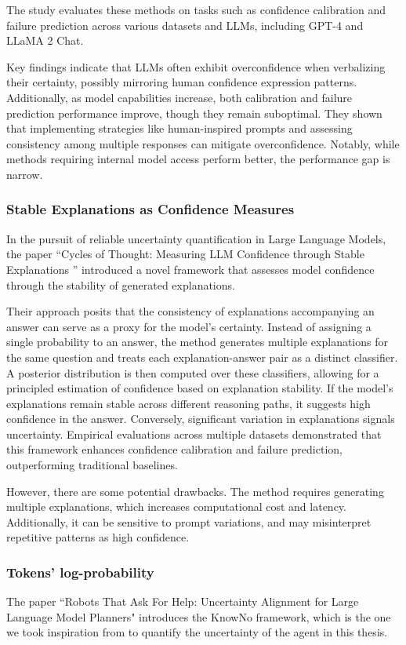 The study evaluates these methods on tasks such as confidence calibration and failure
prediction across various datasets and LLMs, including GPT-4 and LLaMA 2 Chat.

Key findings indicate that LLMs often exhibit overconfidence when verbalizing
their certainty, possibly mirroring human confidence expression patterns.
Additionally, as model capabilities increase, both calibration and failure
prediction performance improve, though they remain suboptimal. They shown that
implementing strategies like human-inspired prompts and assessing consistency
among multiple responses can mitigate overconfidence. Notably, while methods
requiring internal model access perform better, the performance gap is narrow.

\subsubsection{Stable Explanations as Confidence Measures}
In the pursuit of reliable uncertainty quantification in Large Language Models,
the paper ``Cycles of Thought: Measuring LLM Confidence through Stable Explanations
'' \cite{becker2024cyclesthoughtmeasuringllm} introduced a novel framework that
assesses model confidence through the stability of generated explanations.

Their approach posits that the consistency of explanations accompanying an
answer can serve as a proxy for the model's certainty. Instead of assigning a single
probability to an answer, the method generates multiple explanations for the
same question and treats each explanation-answer pair as a distinct classifier. A
posterior distribution is then computed over these classifiers, allowing for a
principled estimation of confidence based on explanation stability. If the model's
explanations remain stable across different reasoning paths, it suggests high
confidence in the answer. Conversely, significant variation in explanations
signals uncertainty. Empirical evaluations across multiple datasets demonstrated
that this framework enhances confidence calibration and failure prediction,
outperforming traditional baselines.

However, there are some potential drawbacks. The method requires generating
multiple explanations, which increases computational cost and latency.
Additionally, it can be sensitive to prompt variations, and may misinterpret
repetitive patterns as high confidence.

\subsubsection{Tokens' log-probability}
The paper ``Robots That Ask For Help: Uncertainty Alignment for Large Language Model
Planners" \cite{ren2023robotsaskhelpuncertainty} introduces the KnowNo framework,
which is the one we took inspiration from to quantify the uncertainty of the agent
in this thesis.

